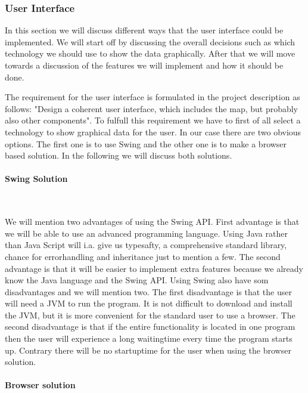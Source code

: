 \documentclass[a4paper,10pt,titlepage]{article}
\begin{document}
			\subsubsection{User Interface}

				In this section we will discuss different ways that the user interface could be implemented. We will start off by discussing the overall decisions such as which technology we should use to show the data graphically. After that we will move towards a discussion of the features we will implement and how it should be done.  

The requirement for the user interface is formulated in the project description as follows: "Design a coherent user interface, which includes the map, but probably also other components". To fulfull this requirement we have to first of all select a technology to show graphical data for the user. In our case there are two obvious options. The first one is to use Swing and the other one is to make a browser based solution. In the following we will discuss both solutions.

\paragraph{Swing Solution}\mbox{}\

We will mention two advantages of using the Swing API. First advantage is that we will be able to use an advanced programming language. Using Java rather than Java Script will i.a. give us typesafty, a comprehensive standard library, chance for errorhandling and inheritance just to mention a few. The second advantage is that it will be easier to implement extra features because we already know the Java language and the Swing API. Using Swing also have som disadvantages and we will mention two. The first disadvantage is that the user will need a JVM to run the program. It is not difficult to download and install the JVM, but it is more convenient for the standard user to use a browser. The second disadvantage is that if the entire functionality is located in one program then the user will experience a long waitingtime every time the program starts up. Contrary there will be no startuptime for the user when using the browser solution. 

\paragraph{Browser solution}\mbox{}\
\end{document}

